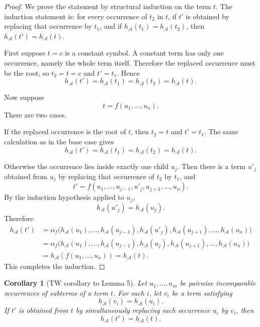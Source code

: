 \documentclass[11pt]{article}
\newtheorem{corollary}[theorem]{Corollary}
\theoremstyle{definition}
\newcommand{\Aut}{\mathcal A}
\begin{document}
\begin{proof}
We prove the statement by structural induction on the term \(t\).  The induction
statement is: for every occurrence of \(t_2\) in \(t\), if \(t'\) is obtained by
replacing that occurrence by \(t_1\), and if \(h_\Aut(t_1)=h_\Aut(t_2)\), then
\(h_\Aut(t')=h_\Aut(t)\).

First suppose \(t=c\) is a constant symbol.  A constant term has only one
occurrence, namely the whole term itself.  Therefore the replaced occurrence must
be the root, so \(t_2=t=c\) and \(t'=t_1\).  Hence
\[
  h_\Aut(t')
  =
  h_\Aut(t_1)
  =
  h_\Aut(t_2)
  =
  h_\Aut(t).
\]

Now suppose
\[
  t=f(u_1,\ldots,u_n).
\]
There are two cases.

If the replaced occurrence is the root of \(t\), then \(t_2=t\) and \(t'=t_1\).
The same calculation as in the base case gives
\[
  h_\Aut(t')=h_\Aut(t_1)=h_\Aut(t_2)=h_\Aut(t).
\]

Otherwise the occurrence lies inside exactly one child \(u_j\).  Then there is a
term \(u'_j\) obtained from \(u_j\) by replacing that occurrence of \(t_2\) by
\(t_1\), and
\[
  t'=f(u_1,\ldots,u_{j-1},u'_j,u_{j+1},\ldots,u_n).
\]
By the induction hypothesis applied to \(u_j\),
\[
  h_\Aut(u'_j)=h_\Aut(u_j).
\]
Therefore
\begin{align*}
  h_\Aut(t')
  &=
  \alpha_f\bigl(h_\Aut(u_1),\ldots,h_\Aut(u_{j-1}),
    h_\Aut(u'_j),h_\Aut(u_{j+1}),\ldots,h_\Aut(u_n)\bigr) \\
  &=
  \alpha_f\bigl(h_\Aut(u_1),\ldots,h_\Aut(u_{j-1}),
    h_\Aut(u_j),h_\Aut(u_{j+1}),\ldots,h_\Aut(u_n)\bigr) \\
  &=
  h_\Aut(f(u_1,\ldots,u_n))
  =
  h_\Aut(t).
\end{align*}
This completes the induction.
\end{proof}

\begin{corollary}[TW corollary to Lemma 5]
Let \(u_1,\ldots,u_m\) be pairwise incomparable occurrences of subterms of a term
\(t\).  For each \(i\), let \(v_i\) be a term satisfying
\[
  h_\Aut(v_i)=h_\Aut(u_i).
\]
If \(t'\) is obtained from \(t\) by simultaneously replacing each occurrence
\(u_i\) by \(v_i\), then
\[
  h_\Aut(t')=h_\Aut(t).
\]
\end{corollary}
\end{document}
